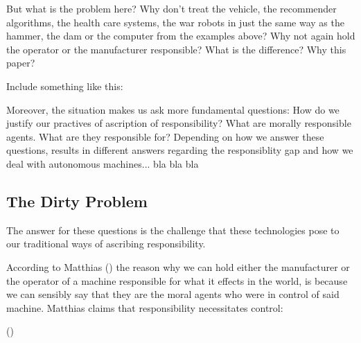 \documentclass{article}
\newcounter{example}[section]
\begin{document}
But what is the problem here? Why don't treat the vehicle, the recommender
algorithms, the health care systems, the war robots in just the same way as the
hammer, the dam or the computer from the examples above? Why not again hold the
operator or the manufacturer responsible? What is the difference? Why this
paper?


Include something like this:

Moreover, the situation makes us ask more fundamental questions: How do we
justify our practives of ascription of responsibility? What are morally
responsible agents. What are they responsible for? Depending on how we answer
these questions, results in different answers regarding the responsiblity gap
and how we deal with autonomous machines... bla bla bla




%

\subsection{The Dirty Problem}

The answer for these questions is the challenge that these technologies pose to
our traditional ways of ascribing responsibility.

According to Matthias (\cite{Matthias_2004}) the reason why we can hold either the
manufacturer or the operator of a machine responsible for what it effects in the
world, is because we can sensibly say that they are the moral agents who were in
control of said machine. Matthias claims that responsibility necessitates control:

\vspace{.8em}
 (\cite[p.175]{Matthias_2004})
\end{document}
